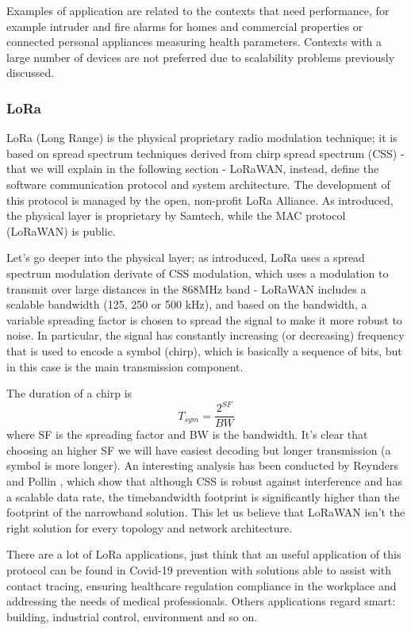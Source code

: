 \documentclass[sigconf]{acmart}
\begin{document}
      Examples of application are related to the contexts that need performance, for example intruder and fire alarms for homes and commercial properties or connected personal appliances measuring health parameters. Contexts with a large number of devices are not preferred due to scalability problems previously discussed.
      \subsubsection{LoRa\textup{\textregistered}}
      LoRa\textup{\textregistered} (Long Range) is the physical proprietary radio modulation technique; it is based on spread spectrum techniques derived from chirp spread spectrum (CSS) - that we will explain in the following section - LoRaWAN, instead, define the software communication protocol and system architecture. The development of this protocol is managed by the open, non-profit LoRa Alliance. As introduced, the physical layer is proprietary by Samtech, while the MAC protocol (LoRaWAN) is public.
      
      Let's go deeper into the physical layer; as introduced, LoRa\textup{\textregistered} uses a spread spectrum modulation derivate of CSS modulation, which uses a modulation to transmit over large distances in the 868MHz band - LoRaWAN includes a scalable bandwidth (125, 250 or 500 kHz), and based on the bandwidth, a variable spreading factor is chosen to spread the signal to make it more robust to noise. In particular, the signal has constantly increasing (or decreasing) frequency that is used to encode a symbol (chirp), which is basically a sequence of bits, but in this case is the main transmission component.
      
      The duration of a chirp is \[ T_{sym} = \frac{2^{SF}}{BW} \] where SF is the spreading factor and BW is the bandwidth. It's clear that choosing an higher SF we will have easiest decoding but longer transmission (a symbol is more longer). An interesting analysis has been conducted by Reynders and Pollin \cite{reynders}, which show that although CSS is robust against interference and has a scalable data rate, the timebandwidth footprint is significantly higher than the footprint of the narrowband solution. This let us believe that LoRaWAN isn't the right solution for every topology and network architecture.
      
      There are a lot of LoRa\textup{\textregistered} applications, just think that an useful application of this protocol can be found in Covid-19 prevention with solutions able to assist with contact tracing, ensuring healthcare regulation compliance in the workplace and addressing the needs of medical professionals. Others applications regard smart: building, industrial control, environment and so on.
\end{document}
